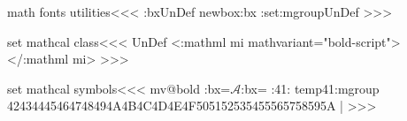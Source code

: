 {{{{{{\<math fonts utilities\><<<
\ifx \tmp:bx\:UnDef \csname newbox\endcsname \tmp:bx \fi
\ifx \find:set:mgroup\:UnDef 
   \def\find:set:mgroup#1#2#3{\bgroup
     \def\use@mathgroup##1##2##3{\relax
       \tmp:cnt=##2%
       \xdef\:temp####1{\noexpand\Configure{MathClass}{#2}%
           {}{}{}{\mathchar"0\the\tmp:cnt ####1}}%
     }%
     \setbox\tmp:bx=\hbox{$#1$}\setbox\tmp:bx=\hbox{}%
     \set:mgroup#3{}{}%
     \egroup
   }
\fi
\def\set:mgroup#1#2{\if :#1#2:\else
   \:temp{#1#2}\expandafter\set:mgroup \fi}
>>>



\<set mathcal class\><<<
\ifx \mathboldcalMathClass\:UnDef
  \NewMathClass\mathboldcalMathClass
\fi
{}
    {<\a:mathml mi\Hnewline
         mathvariant="bold-script">}{</\a:mathml mi>}{}  
>>>

\<set mathcal symbols\><<<
\expandafter\ifx\csname mv@bold\endcsname\relax  \else
\bgroup
{}%
\find:set:mgroup{\mathcal{A}}{\mathboldcalMathClass}%
  {4142434445464748494A4B4C4D4E4F505152535455565758595A} |%
\egroup
\fi
>>>






}}}}}}
